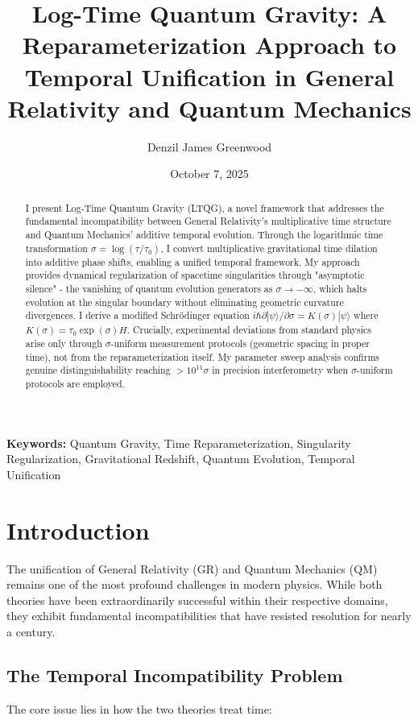 \documentclass[12pt,a4paper]{article}
\title{\textbf{Log-Time Quantum Gravity: A Reparameterization Approach to Temporal Unification in General Relativity and Quantum Mechanics}}
\author[1]{Denzil James Greenwood}
\affil[1]{Independent Researcher}
\date{October 7, 2025}
\begin{document}
\maketitle

\begin{abstract}
I present Log-Time Quantum Gravity (LTQG), a novel framework that addresses the fundamental incompatibility between General Relativity's multiplicative time structure and Quantum Mechanics' additive temporal evolution. Through the logarithmic time transformation $\sigma = \log(\tau/\tau_0)$, I convert multiplicative gravitational time dilation into additive phase shifts, enabling a unified temporal framework. My approach provides dynamical regularization of spacetime singularities through "asymptotic silence" - the vanishing of quantum evolution generators as $\sigma \to -\infty$, which halts evolution at the singular boundary without eliminating geometric curvature divergences. I derive a modified Schrödinger equation $i\hbar \partial|\psi\rangle/\partial\sigma = K(\sigma)|\psi\rangle$ where $K(\sigma) = \tau_0 \exp(\sigma) H$. Crucially, experimental deviations from standard physics arise only through $\sigma$-uniform measurement protocols (geometric spacing in proper time), not from the reparameterization itself. My parameter sweep analysis confirms genuine distinguishability reaching $>10^{11}\sigma$ in precision interferometry when $\sigma$-uniform protocols are employed.
\end{abstract}

\textbf{Keywords:} Quantum Gravity, Time Reparameterization, Singularity Regularization, Gravitational Redshift, Quantum Evolution, Temporal Unification

\section{Introduction}

The unification of General Relativity (GR) and Quantum Mechanics (QM) remains one of the most profound challenges in modern physics. While both theories have been extraordinarily successful within their respective domains, they exhibit fundamental incompatibilities that have resisted resolution for nearly a century.

\subsection{The Temporal Incompatibility Problem}

The core issue lies in how the two theories treat time:
\end{document}
